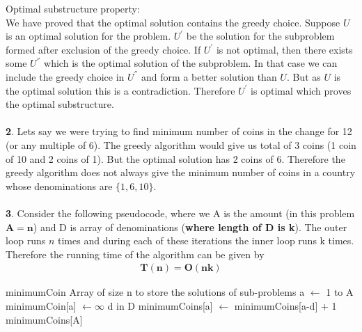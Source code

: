 \documentclass[a4paper,11pt]{article}
\theoremstyle{quest}
\newenvironment{solution}[2][Solution]{\begin{trivlist}
		\item[\hskip \labelsep {\bfseries #1}\hskip \labelsep {\bfseries #2.}]}{\end{trivlist}}
\begin{document}
\begin{solution}
		\textbf{Optimal substructure property:}\\
		We have proved that the optimal solution contains the greedy choice. Suppose $U$ is an optimal solution for the problem. $U^{'}$ be the solution for the subproblem formed after exclusion of the greedy choice. If $U^{'}$ is not optimal, then there exists some $U^{''}$ which is the optimal solution of the subproblem. In that case we can include the greedy choice in $U^{''}$ and form a better solution than $U$. But as $U$ is the optimal solution this is a contradiction. Therefore $U^{'}$ is optimal which proves the optimal substructure.\\\\
		\textbf{2}. Lets say we were trying to find minimum  number of coins in the change for 12 (or any multiple of 6). The greedy algorithm would give us total of 3 coins (1 coin of 10 and 2 coins of 1). But the optimal solution has 2 coins of 6. Therefore  the greedy algorithm does not always give the minimum number of coins in a country whose denominations are $\{1, 6, 10\}$.\\\\
		\textbf{3}. Consider the following pseudocode, where we A is the amount (in this problem $\mathbf{A = n}$) and D is array of denominations (\textbf{where length of D is k}). The outer loop runs $n$ times and during each of these iterations the inner loop runs k times. Therefore the running time of the algorithm can be given by
		\begin{align*}
		\boxed{\mathbf{T(n) = O(nk)}}
		\end{align*}

		\begin{algorithm}[h]
			\caption{}
			\label{Algorithm}
			\begin{algorithmic}
				\State minimumCoin
				\Comment Array of size n to store the solutions of sub-problems
				\For a $\gets$ 1 to A
				\State minimumCoin[a] $\gets \infty$
				\For d in D
				\State minimumCoins[a] $\gets$ minimumCoins[a-d] + 1
				\EndIf
				\EndFor
				\EndFor \\
				\Return minimumCoins[A]
				\EndFunction	
				\end{algorithmic} 	
				\end{algorithm}

\end{solution} 
\end{document}
